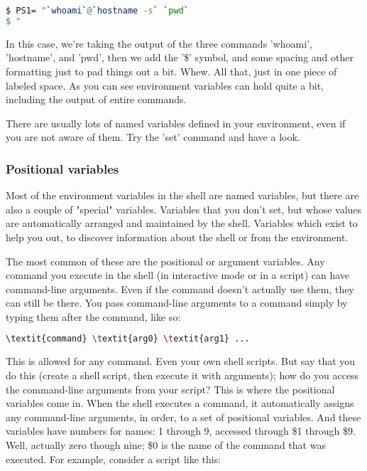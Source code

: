 \lstset{basicstyle=\scriptsize, numbers=left, captionpos=b, tabsize=4}
\begin{lstlisting}[caption=Assigning a combined value to a variable,language={bash},
xleftmargin=15pt,label=lst:Assigningacombinedvaluetoavariable4]
$ PS1= "`whoami`@`hostname -s` `pwd` 
$ "
\end{lstlisting}


In this case, we're taking the output of the three commands 'whoami',
'hostname', and 'pwd', then we add the '\$' symbol, and some spacing and other
formatting just to pad things out a bit. Whew. All that, just in one piece of
labeled space. As you can see environment variables can hold quite a bit,
including the output of entire commands.

There are usually lots of named variables defined in your environment, even if
you are not aware of them. Try the 'set' command and have a look.

\subsubsection{Positional variables}
Most of the environment variables in the shell are named variables, but there
are also a couple of "special" variables. Variables that you don't set, but
whose values are automatically arranged and maintained by the shell. Variables
which exist to help you out, to discover information about the shell or from
the environment.

The most common of these are the positional or argument variables. Any command
you execute in the shell (in interactive mode or in a script) can have
command-line arguments. Even if the command doesn't actually use them, they can
still be there. You pass command-line arguments to a command simply by typing
them after the command, like so:

\lstset{basicstyle=\scriptsize, numbers=left, captionpos=b, tabsize=4}
\begin{lstlisting}[language={bash},
xleftmargin=15pt]
\textit{command} \textit{arg0} \textit{arg1} ...
\end{lstlisting}

This is allowed for any command. Even your own shell scripts. But say that you
do this (create a shell script, then execute it with arguments); how do you
access the command-line arguments from your script? This is where the
positional variables come in. When the shell executes a command, it
automatically assigns any command-line arguments, in order, to a set of
positional variables. And these variables have numbers for names: 1 through 9,
accessed through \$1 through \$9. Well, actually zero though nine; \$0 is the
name of the command that was executed. For example, consider a script like
this:

